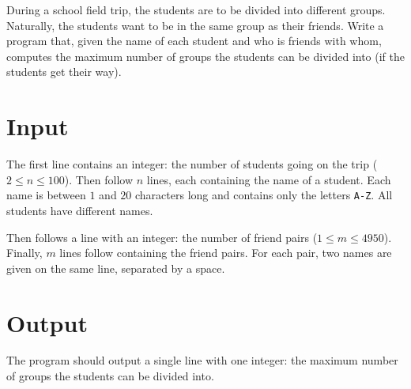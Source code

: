 During a school field trip, the students are to be divided into different groups.
Naturally, the students want to be in the same group as their friends.
Write a program that, given the name of each student and who is friends with whom, computes the maximum number of groups the students can be divided into (if the students get their way).

\section*{Input}
The first line contains an integer: the number of students going on the trip ($2 \le n \le 100$).
Then follow $n$ lines, each containing the name of a student.
Each name is between $1$ and $20$ characters long and contains only the letters \texttt{A-Z}.
All students have different names.

Then follows a line with an integer: the number of friend pairs ($1 \le m \le 4950$).
Finally, $m$ lines follow containing the friend pairs.
For each pair, two names are given on the same line, separated by a space.

\section*{Output}
The program should output a single line with one integer: the maximum number of groups the students can be divided into.
